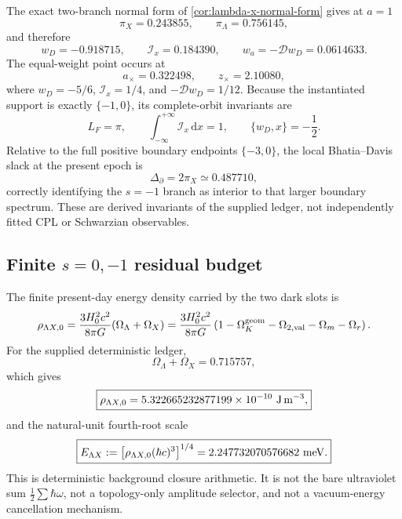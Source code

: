 \documentclass[aps,prd,reprint,onecolumn,nofootinbib,superscriptaddress,showkeys]{revtex4-2}
\numberwithin{equation}{section}
\theoremstyle{definition}
\theoremstyle{plain}
\newcommand{\dd}{\mathrm d}
\newcommand{\Dil}{\mathscr D}
\begin{document}
The exact two-branch normal form of \cref{cor:lambda-x-normal-form} gives at \(a=1\)
\begin{equation}
\pi_X=0.243855,
\qquad
\pi_\Lambda=0.756145,
\end{equation}
and therefore
\begin{equation}
\boxed{
w_D=-0.918715,
\qquad
\mathcal I_x=0.184390,
\qquad
w_a=-\Dil w_D=0.0614633.
}
\end{equation}
The equal-weight point occurs at
\begin{equation}
a_\times=0.322498,
\qquad
\boxed{z_\times=2.10080},
\end{equation}
where \(w_D=-5/6\), \(\mathcal I_x=1/4\), and \(-\Dil w_D=1/12\).  Because the instantiated support is exactly \(\{-1,0\}\), its complete-orbit invariants are
\begin{equation}
\boxed{
L_F=\pi,
\qquad
\int_{-\infty}^{+\infty}\mathcal I_x\,\dd x=1,
\qquad
\{w_D,x\}=-\frac12.
}
\end{equation}
Relative to the full positive boundary endpoints \(\{-3,0\}\), the local Bhatia--Davis slack at the present epoch is
\begin{equation}
\Delta_\partial=2\pi_X\simeq0.487710,
\end{equation}
correctly identifying the \(s=-1\) branch as interior to that larger boundary spectrum.  These are derived invariants of the supplied ledger, not independently fitted CPL or Schwarzian observables.

\subsection{Finite \texorpdfstring{$s=0,-1$}{s=0,-1} residual budget}

The finite present-day energy density carried by the two dark slots is
\begin{equation}
\rho_{\Lambda X,0}
=
\frac{3H_0^2c^2}{8\pi G}(\Omega_\Lambda+\Omega_X)
=
\frac{3H_0^2c^2}{8\pi G}
\left(1-\Omega_K^{\rm geom}-\Omega_{2,{\rm val}}-\Omega_m-\Omega_r\right).
\end{equation}
For the supplied deterministic ledger,
\begin{equation}
\Omega_\Lambda+\Omega_X=0.715757,
\end{equation}
which gives
\begin{equation}
\boxed{
\rho_{\Lambda X,0}=5.322665232877199\times10^{-10}\ {\rm J\,m^{-3}},
}
\end{equation}
and the natural-unit fourth-root scale
\begin{equation}
\boxed{
E_{\Lambda X}
:=\bigl[\rho_{\Lambda X,0}(\hbar c)^3\bigr]^{1/4}
=2.247732070576682\ {\rm meV}.
}
\end{equation}
This is deterministic background closure arithmetic.  It is not the bare ultraviolet sum \(\frac12\sum\hbar\omega\), not a topology-only amplitude selector, and not a vacuum-energy cancellation mechanism.
\end{document}
